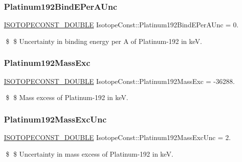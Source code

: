 \subsubsection{\texorpdfstring{Platinum192\+Bind\+E\+Per\+A\+Unc}{Platinum192BindEPerAUnc}}
{\footnotesize\ttfamily \mbox{\hyperlink{group___isotope_const-_macros_ga8f45a7272ce02c0b4c65c44636ed719a}{I\+S\+O\+T\+O\+P\+E\+C\+O\+N\+S\+T\+\_\+\+D\+O\+U\+B\+LE}} Isotope\+Const\+::\+Platinum192\+Bind\+E\+Per\+A\+Unc = 0.}

\$ \$ Uncertainty in binding energy per A of Platinum-\/192 in keV. \mbox{\label{group___isotope_const-_platinum-_pt192_gab9e917277398964f57ade733d57026d1}} 
\subsubsection{\texorpdfstring{Platinum192\+Mass\+Exc}{Platinum192MassExc}}
{\footnotesize\ttfamily \mbox{\hyperlink{group___isotope_const-_macros_ga8f45a7272ce02c0b4c65c44636ed719a}{I\+S\+O\+T\+O\+P\+E\+C\+O\+N\+S\+T\+\_\+\+D\+O\+U\+B\+LE}} Isotope\+Const\+::\+Platinum192\+Mass\+Exc = -\/36288.}

\$ \$ Mass excess of Platinum-\/192 in keV. \mbox{\label{group___isotope_const-_platinum-_pt192_gaabbd829350c1001efea66bbc9084730e}} 
\subsubsection{\texorpdfstring{Platinum192\+Mass\+Exc\+Unc}{Platinum192MassExcUnc}}
{\footnotesize\ttfamily \mbox{\hyperlink{group___isotope_const-_macros_ga8f45a7272ce02c0b4c65c44636ed719a}{I\+S\+O\+T\+O\+P\+E\+C\+O\+N\+S\+T\+\_\+\+D\+O\+U\+B\+LE}} Isotope\+Const\+::\+Platinum192\+Mass\+Exc\+Unc = 2.}

\$ \$ Uncertainty in mass excess of Platinum-\/192 in keV. \mbox{\label{group___isotope_const-_platinum-_pt192_ga70fbdbbe2cdc3c0f3fabadf2f6fd9629}} 
